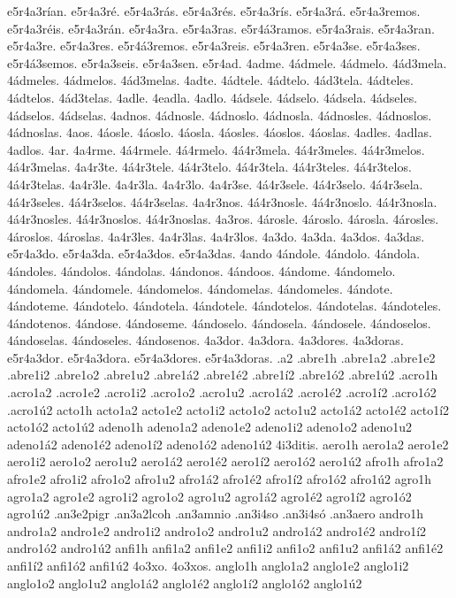 {e5r4a3rían.
e5r4a3ré.
e5r4a3rás.
e5r4a3rés.
e5r4a3rís.
e5r4a3rá.
e5r4a3remos.
e5r4a3réis.
e5r4a3rán.
e5r4a3ra.
e5r4a3ras.
e5r4á3ramos.
e5r4a3rais.
e5r4a3ran.
e5r4a3re.
e5r4a3res.
e5r4á3remos.
e5r4a3reis.
e5r4a3ren.
e5r4a3se.
e5r4a3ses.
e5r4á3semos.
e5r4a3seis.
e5r4a3sen.
e5r4ad.
4adme.
4ádmele.
4ádmelo.
4ád3mela.
4ádmeles.
4ádmelos.
4ád3melas.
4adte.
4ádtele.
4ádtelo.
4ád3tela.
4ádteles.
4ádtelos.
4ád3telas.
4adle.
4eadla.
4adlo.
4ádsele.
4ádselo.
4ádsela.
4ádseles.
4ádselos.
4ádselas.
4adnos.
4ádnosle.
4ádnoslo.
4ádnosla.
4ádnosles.
4ádnoslos.
4ádnoslas.
4aos.
4áosle.
4áoslo.
4áosla.
4áosles.
4áoslos.
4áoslas.
4adles.
4adlas.
4adlos.
4ar.
4a4rme.
4á4rmele.
4á4rmelo.
4á4r3mela.
4á4r3meles.
4á4r3melos.
4á4r3melas.
4a4r3te.
4á4r3tele.
4á4r3telo.
4á4r3tela.
4á4r3teles.
4á4r3telos.
4á4r3telas.
4a4r3le.
4a4r3la.
4a4r3lo.
4a4r3se.
4á4r3sele.
4á4r3selo.
4á4r3sela.
4á4r3seles.
4á4r3selos.
4á4r3selas.
4a4r3nos.
4á4r3nosle.
4á4r3noslo.
4á4r3nosla.
4á4r3nosles.
4á4r3noslos.
4á4r3noslas.
4a3ros.
4árosle.
4ároslo.
4árosla.
4árosles.
4ároslos.
4ároslas.
4a4r3les.
4a4r3las.
4a4r3los.
4a3do.
4a3da.
4a3dos.
4a3das.
e5r4a3do.
e5r4a3da.
e5r4a3dos.
e5r4a3das.
4ando
4ándole.
4ándolo.
4ándola.
4ándoles.
4ándolos.
4ándolas.
4ándonos.
4ándoos.
4ándome.
4ándomelo.
4ándomela.
4ándomele.
4ándomelos.
4ándomelas.
4ándomeles.
4ándote.
4ándoteme.
4ándotelo.
4ándotela.
4ándotele.
4ándotelos.
4ándotelas.
4ándoteles.
4ándotenos.
4ándose.
4ándoseme.
4ándoselo.
4ándosela.
4ándosele.
4ándoselos.
4ándoselas.
4ándoseles.
4ándosenos.
4a3dor.
4a3dora.
4a3dores.
4a3doras.
e5r4a3dor.
e5r4a3dora.
e5r4a3dores.
e5r4a3doras.
.a2
.abre1h
.abre1a2 .abre1e2 .abre1i2 .abre1o2 .abre1u2
.abre1á2 .abre1é2 .abre1í2 .abre1ó2 .abre1ú2
.acro1h
.acro1a2 .acro1e2 .acro1i2 .acro1o2 .acro1u2
.acro1á2 .acro1é2 .acro1í2 .acro1ó2 .acro1ú2
acto1h
acto1a2 acto1e2 acto1i2 acto1o2 acto1u2
acto1á2 acto1é2 acto1í2 acto1ó2 acto1ú2
adeno1h
adeno1a2 adeno1e2 adeno1i2 adeno1o2 adeno1u2
adeno1á2 adeno1é2 adeno1í2 adeno1ó2 adeno1ú2
4i3ditis.
aero1h
aero1a2 aero1e2 aero1i2 aero1o2 aero1u2
aero1á2 aero1é2 aero1í2 aero1ó2 aero1ú2
afro1h
afro1a2 afro1e2 afro1i2 afro1o2 afro1u2
afro1á2 afro1é2 afro1í2 afro1ó2 afro1ú2
agro1h
agro1a2 agro1e2 agro1i2 agro1o2 agro1u2
agro1á2 agro1é2 agro1í2 agro1ó2 agro1ú2
.an3e2pigr
.an3a2lcoh
.an3amnio
.an3i4so
.an3i4só
.an3aero
andro1h
andro1a2 andro1e2 andro1i2 andro1o2 andro1u2
andro1á2 andro1é2 andro1í2 andro1ó2 andro1ú2
anfi1h
anfi1a2 anfi1e2 anfi1i2 anfi1o2 anfi1u2
anfi1á2 anfi1é2 anfi1í2 anfi1ó2 anfi1ú2
4o3xo.
4o3xos.
anglo1h
anglo1a2 anglo1e2 anglo1i2 anglo1o2 anglo1u2
anglo1á2 anglo1é2 anglo1í2 anglo1ó2 anglo1ú2
}
